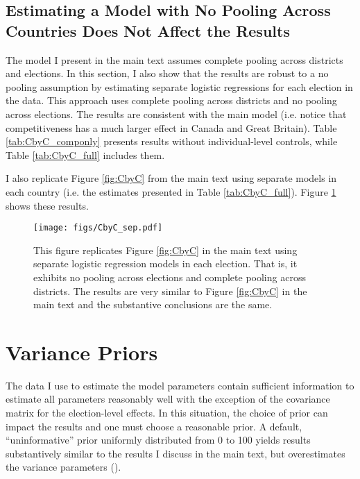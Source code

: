 \documentclass[12pt]{article}
\begin{document}
\begin{appendix}
\clearpage
\subsection{Estimating a Model with No Pooling Across Countries Does Not Affect the Results}
 
The model I present in the main text assumes complete pooling across districts and elections. In this section, I also show that the results are robust to a no pooling assumption by estimating separate logistic regressions for each election in the data. This approach uses complete pooling across districts and no pooling across elections. The results are consistent with the main model (i.e. notice that competitiveness has a much larger effect in Canada and Great Britain). Table \ref{tab:CbyC_componly} presents results without individual-level controls, while Table \ref{tab:CbyC_full} includes them.






I also replicate Figure \ref{fig:CbyC} from the main text using separate models in each country (i.e. the estimates presented in Table \ref{tab:CbyC_full}). Figure \ref{fig:CbyC_sep} shows these results.

\begin{figure}[h!]
\centering
\texttt{[image: figs/CbyC\_sep.pdf]}
\caption{This figure replicates Figure \ref{fig:CbyC} in the main text using separate logistic regression models in each election. That is, it exhibits no pooling across elections and complete pooling across districts. The results are very similar to Figure \ref{fig:CbyC} in the main text and the substantive conclusions are the same.}\label{fig:CbyC_sep}
\end{figure}

\clearpage

\section{Variance Priors}

The data I use to estimate the model parameters contain sufficient information to estimate all parameters reasonably well with the exception of the covariance matrix for the election-level effects. In this situation, the choice of prior can impact the results and one must choose a reasonable prior. A default, ``uninformative'' prior uniformly distributed from 0 to 100 yields results substantively similar to the results I discuss in the main text, but overestimates the variance parameters (\citealt{Gelman2006a}).


\end{appendix}
\end{document}
